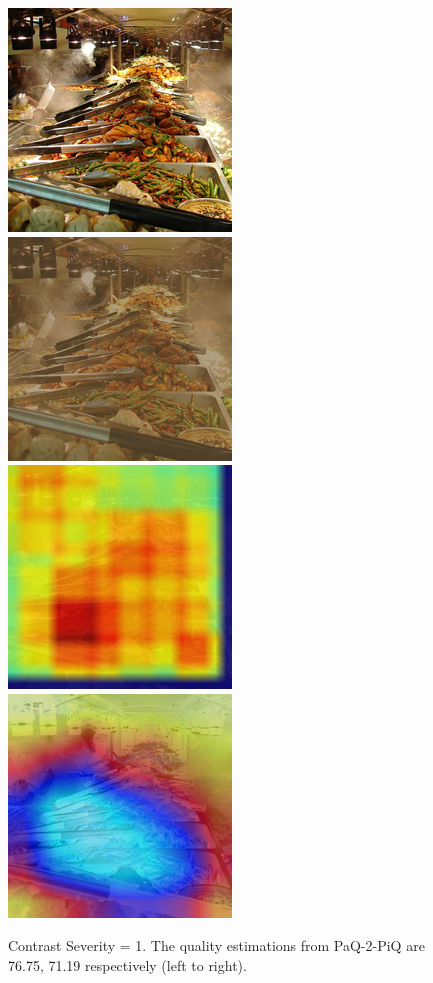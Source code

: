 \documentclass[10pt,twocolumn,letterpaper]{article}
\begin{document}
\begin{figure}[!ht]
	\includegraphics[width=.49\columnwidth]{Images/test_images/severity=0/buffet.png}\hfill
	\includegraphics[width=.49\columnwidth]{Images/test_images/severity=1/contrast/buffet.png}\hfill
	\\[\smallskipamount]
    \includegraphics[width=.49\columnwidth]{Images/saliency_maps/paq2piq/severity=1/contrast/buffet.png}\hfill
	\includegraphics[width=.49\columnwidth]{Images/saliency_maps/resnet18/severity=1/contrast/buffet.png}\hfill
	\caption{Contrast Severity = 1. The quality estimations from PaQ-2-PiQ are 76.75, 71.19 respectively (left to right).}
\end{figure}
\end{document}
